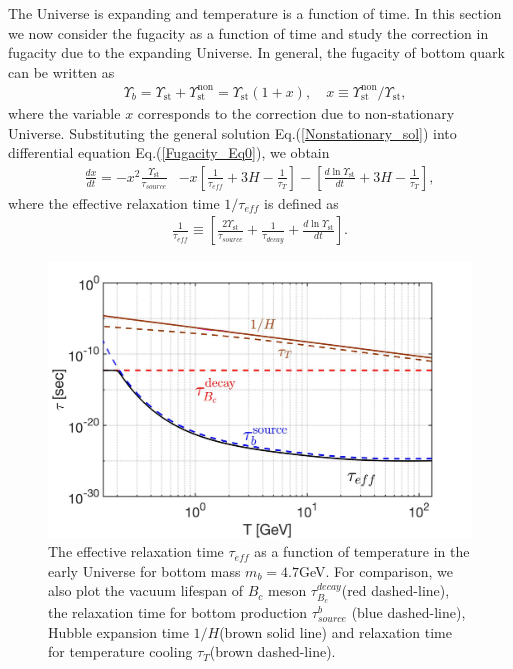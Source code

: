 The Universe is expanding and temperature is a function of time. In this section we now consider the fugacity as a function of time and study the correction in fugacity due to the expanding Universe. In general, the fugacity of bottom quark can be written as 
\begin{align}\label{Nonstationary_sol}
&\Upsilon_b=\Upsilon_{\mathrm{st}}+\Upsilon^{\mathrm{non}}_{\mathrm{st}}=\Upsilon_\mathrm{st}\left(1+x\right),\quad x\equiv{\Upsilon_\mathrm{st}^{\mathrm{non}}}/{\Upsilon_\mathrm{st}},
\end{align}
where the variable $x$ corresponds to the correction due to non-stationary Universe. Substituting the general solution Eq.(\ref{Nonstationary_sol}) into differential equation Eq.(\ref{Fugacity_Eq0}), we obtain
\begin{align}\label{Nonstationary_eq}
\frac{dx}{dt}=-x^2\frac{\Upsilon_\mathrm{st}}{\tau_{source}}&-x\left[\frac{1}{\tau_{eff}}+3H-\frac{1}{\tau_T}\right]-\left[\frac{d\ln\Upsilon_\mathrm{st}}{dt}+3H-\frac{1}{\tau_T}\right],
\end{align}
where the effective relaxation time $1/\tau_{eff}$ is defined as
\begin{align}
\frac{1}{\tau_{eff}}\equiv\left[\frac{2\Upsilon_\mathrm{st}}{\tau_{source}}+\frac{1}{\tau_{decay}}+\frac{d\ln\Upsilon_\mathrm{st}}{dt}\right].
\end{align}
\begin{figure}[t]
\begin{center}
\includegraphics[width=\textwidth]{./plots/Tau_RelaxationTime002}
\caption{The effective relaxation time $\tau_{eff}$ as a function of temperature in the early Universe for bottom mass $m_b=4.7$GeV.  For comparison, we also plot the vacuum lifespan of $B_c$ meson $\tau_{B_c}^{decay}$(red dashed-line), the relaxation time for bottom production $\tau^b_{source}$ (blue dashed-line), Hubble expansion time $1/H$(brown solid line) and relaxation time for temperature cooling $\tau_T$(brown dashed-line).  }
\label{RelaxationTime_eff}
\end{center}
\end{figure}
